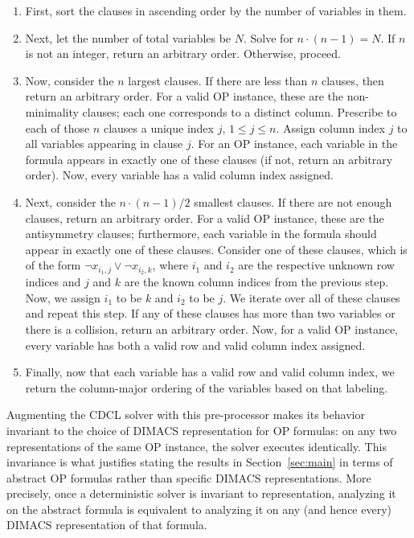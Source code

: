 \documentclass[a4paper,UKenglish,cleveref, autoref, thm-restate]{lipics-v2021}
\begin{document}
\begin{enumerate}
    \item First, sort the clauses in ascending order by the number of variables in them. 
    \item Next, let the number of total variables be $N$. Solve for $n \cdot (n - 1) = N$. If $n$ is not an integer, return an arbitrary order. Otherwise, proceed. 
    \item Now, consider the $n$ largest clauses. If there are less than $n$ clauses, then return an arbitrary order. For a valid OP instance, these are the non-minimality clauses; each one corresponds to a distinct column. Prescribe to each of those $n$ clauses a unique index $j$, $1 \leq j \leq n$. Assign column index $j$ to all variables appearing in clause $j$. For an OP instance, each variable in the formula appears in exactly one of these clauses (if not, return an arbitrary order). Now, every variable has a valid column index assigned. 
    \item Next, consider the $n \cdot (n - 1) / 2$ smallest clauses. If there are not enough clauses, return an arbitrary order. For a valid OP instance, these are the antisymmetry clauses; furthermore, each variable in the formula should appear in exactly one of these clauses. Consider one of these clauses, which is of the form $\neg x_{i_1, j} \lor \neg x_{i_2, k}$, where $i_1$ and $i_2$ are the respective unknown row indices and $j$ and $k$ are the known column indices from the previous step. Now, we assign $i_1$ to be $k$ and $i_2$ to be $j$. We iterate over all of these clauses and repeat this step. If any of these clauses has more than two variables or there is a collision, return an arbitrary order. Now, for a valid OP instance, every variable has both a valid row and valid column index assigned. 
    \item Finally, now that each variable has a valid row and valid column index, we return the column-major ordering of the variables based on that labeling.
\end{enumerate}

Augmenting the CDCL solver with this pre-processor makes its behavior invariant to the choice of DIMACS representation for OP formulas: on any two representations of the same OP instance, the solver executes identically. This invariance is what justifies stating the results in Section~\ref{sec:main} in terms of abstract OP formulas rather than specific DIMACS representations. More precisely, once a deterministic solver is invariant to representation, analyzing it on the abstract formula is equivalent to analyzing it on any (and hence every) DIMACS representation of that formula.
\end{document}

